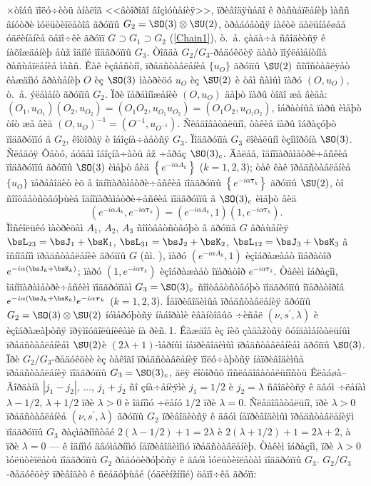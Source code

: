 ×òîáû ïîëó÷èòü àíàëîã <<âòîðîãî âîçìóùåíèÿ>>, ïðèâîäÿùåãî ê ðàñùåïëåíèþ ìàññ âíóòðè ìóëüòèïëåòîâ ãðóïïû $G_2=\SO(3)\otimes\SU(2)$, òðåáóåòñÿ íàéòè äàëüíåéøåå óäëèíåíèå öåïî÷êè ãðóïï $G\supset G_1\supset G_2$ (\ref{Chain1}), ò.~å. çàäà÷à ñâîäèòñÿ ê íàõîæäåíèþ åùž îäíîé ïîäãðóïïû $G_3$. Òîãäà $G_2/G_3$-ðåäóêöèÿ äàñò ïîýëåìåíòíîå ðàñùåïëåíèå ìàññ. Êàê èçâåñòíî, ïðåäñòàâëåíèå $\{u_O\}$ ãðóïïû $\SU(2)$ ñîïîñòàâëÿåò êàæäîìó âðàùåíèþ $O$ èç $\SO(3)$ ìàòðèöó $u_O$ èç $\SU(2)$ è òåì ñàìûì ïàðó $(O,u_O)$, ò.~å. ýëåìåíò ãðóïïû $G_2$. Ïðè ïåðåìíîæåíèè $(O,u_O)$ äàþò ïàðû òîãî æå âèäà: $(O_1,u_{O_1})(O_2,u_{O_2})=(O_1O_2,u_{O_1}u_{O_2})=(O_1O_2,u_{O_1O_2})$, îáðàòíûå ïàðû èìåþò òîò æå âèä $(O,u_O)^{-1}=(O^{-1},u_{O^{-1}})$. Ñëåäîâàòåëüíî, òàêèå ïàðû îáðàçóþò ïîäãðóïïó â $G_2$, êîòîðàÿ è îáîçíà÷àåòñÿ $G_3$. Ïîäãðóïïà $G_3$ ëîêàëüíî èçîìîðôíà $\SO(3)$. Ñëåäóÿ Ôåòó, áóäåì îáîçíà÷àòü åž ÷åðåç $\SO(3)_c$. Äàëåå, îäíîïàðàìåòðè÷åñêèå ïîäãðóïïû ãðóïïû $\SO(3)$ èìåþò âèä $\left\{e^{-i\alpha A_k}\right\}$ ($k=1,2,3$); òàê êàê ïðåäñòàâëåíèå $\{u_O\}$ ïåðåâîäèò èõ â îäíîïàðàìåòðè÷åñêèå ïîäãðóïïû $\left\{e^{-i\alpha\boldsymbol{\tau}_k}\right\}$ ãðóïïû $\SU(2)$, òî ñîîòâåòñòâóþùèå îäíîïàðàìåòðè÷åñêèå ïîäãðóïïû â $\SO(3)_c$ èìåþò âèä
\[
\left(e^{-i\alpha A_k},e^{-i\alpha\boldsymbol{\tau}_k}\right)=\left(e^{-i\alpha A_k},1\right)
\left(1,e^{-i\alpha\boldsymbol{\tau}_k}\right).
\]
Ïîñêîëüêó ìàòðèöàì $A_1$, $A_2$, $A_3$ ñîîòâåòñòâóþò â ãðóïïå $G$ âðàùåíèÿ\lb $\bsL_{23}=\bsJ_1+\bsK_1$, $\bsL_{31}=\bsJ_2+\bsK_2$, $\bsL_{12}=\bsJ_3+\bsK_3$ â îñíîâíîì ïðåäñòàâëåíèè ãðóïïû $G$ (ñì. \cite{Var18}), ïàðó $\left(e^{-i\alpha A_k},1\right)$ èçîáðàæàåò îïåðàòîð $e^{-i\alpha(\bsJ_k+\bsK_k)}$; ïàðó $\left(1,e^{-i\alpha\boldsymbol{\tau}_k}\right)$ èçîáðàæàåò îïåðàòîð $e^{-i\alpha\boldsymbol{\tau}_k}$. Òàêèì îáðàçîì, îäíîïàðàìåòðè÷åñêèì ïîäãðóïïàì $G_3=\SO(3)_c$ ñîîòâåòñòâóþò ïîäãðóïïû îïåðàòîðîâ $e^{-i\alpha(\bsJ_k+\bsK_k)}e^{-i\alpha\boldsymbol{\tau}_k}$ ($k=1,2,3$). Íåïðèâîäèìûå ïðåäñòàâëåíèÿ ãðóïïû $G_2=\SO(3)\otimes\SU(2)$ íóìåðóþòñÿ íàáîðàìè êâàíòîâûõ ÷èñåë $(\nu,s^\prime,\lambda)$ è èçîáðàæàþòñÿ ïðÿìîóãîëüíèêàìè íà ðèñ.\,1. Êàæäîå èç íèõ çàäàžòñÿ ôóíäàìåíòàëüíûì ïðåäñòàâëåíèåì $\SU(2)$\lb è $(2\lambda+1)$-ìåðíûì íåïðèâîäèìûì ïðåäñòàâëåíèåì ãðóïïû $\SO(3)$. Ïðè $G_2/G_3$-ðåäóêöèè èç òàêîãî ïðåäñòàâëåíèÿ ïîëó÷àþòñÿ íåïðèâîäèìûå ïðåäñòàâëåíèÿ ïîäãðóïïû $G_3=\SO(3)_c$, äëÿ êîòîðûõ ïîñëåäîâàòåëüíîñòü Êëåáøà--Ãîðäàíà $\left|j_1-j_2\right|$, $\ldots$, $j_1+j_2$ ñî çíà÷åíèÿìè $j_1=1/2$ è $j_2=\lambda$ ñâîäèòñÿ ê äâóì ÷ëåíàì $\lambda-1/2$, $\lambda+1/2$ ïðè $\lambda>0$ è îäíîìó ÷ëåíó $1/2$ ïðè $\lambda=0$. Ñëåäîâàòåëüíî, ïðè $\lambda>0$ ïðåäñòàâëåíèå $(\nu,s^\prime,\lambda)$ ãðóïïû $G_2$ ïðèâîäèòñÿ ê äâóì íåïðèâîäèìûì ïðåäñòàâëåíèÿì ïîäãðóïïû $G_3$ ðàçìåðíîñòåé $2(\lambda-1/2)+1=2\lambda$ è $2(\lambda+1/2)+1=2\lambda+2$, à ïðè $\lambda=0$ --- ê îäíîìó äâóìåðíîìó íåïðèâîäèìîìó ïðåäñòàâëåíèþ. Òàêèì îáðàçîì, ïðè $\lambda>0$ ìóëüòèïëåòû ïîäãðóïïû $G_2$ ðåäóöèðóþòñÿ ê äâóì ìóëüòèïëåòàì ïîäãðóïïû $G_3$. $G_2/G_3$-ðåäóêöèÿ ïðèâîäèò ê ñëåäóþùåé (óäëèížííîé) öåïî÷êå ãðóïï:
